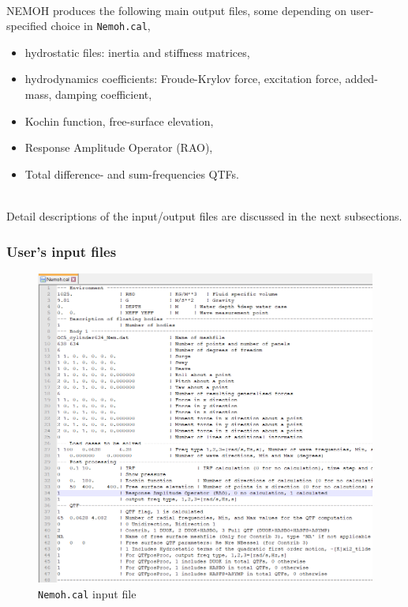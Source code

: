 \documentclass[12pt,a4paper,titlepage]{article}
\begin{document}
\ \\
NEMOH produces the following main output files, some depending on user-specified choice in \texttt{Nemoh.cal},
\begin{itemize}
\item hydrostatic files: inertia and stiffness matrices,
\item hydrodynamics coefficients: Froude-Krylov force, excitation force, added-mass, damping coefficient,
\item Kochin function, free-surface elevation,
\item Response Amplitude Operator (RAO),
\item Total difference- and sum-frequencies QTFs.
\end{itemize}
\ \\
Detail descriptions of the input/output files are discussed in the next subsections.

\subsubsection{User's input files}

\begin{figure}[ht]
\centering
\includegraphics[scale=0.8,trim = 0mm 0mm 12mm 0mm, clip]{figures/NemohCal.png}
\caption{\texttt{Nemoh.cal} input file}\label{fig:NemohCal}
\end{figure}
\end{document}
